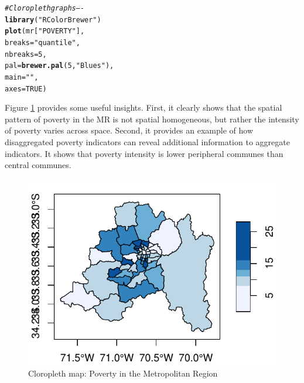 \documentclass[english,12pt]{book}\usepackage[]{graphicx}\usepackage[]{xcolor}
\makeatletter
\def\maxwidth{ %
  \ifdim\Gin@nat@width>\linewidth
    \linewidth
  \else
    \Gin@nat@width
  \fi
}
\newcommand{\hlnum}[1]{\textcolor[rgb]{0.686,0.059,0.569}{#1}}%
\newcommand{\hlstr}[1]{\textcolor[rgb]{0.192,0.494,0.8}{#1}}%
\newcommand{\hlcom}[1]{\textcolor[rgb]{0.678,0.584,0.686}{\textit{#1}}}%
\newcommand{\hlstd}[1]{\textcolor[rgb]{0.345,0.345,0.345}{#1}}%
\newcommand{\hlkwc}[1]{\textcolor[rgb]{0.333,0.667,0.333}{#1}}%
\newcommand{\hlkwd}[1]{\textcolor[rgb]{0.737,0.353,0.396}{\textbf{#1}}}%
\newenvironment{kframe}{%
 \def\at@end@of@kframe{}%
 \ifinner\ifhmode%
  \def\at@end@of@kframe{\end{minipage}}%
  \begin{minipage}{\columnwidth}%
 \fi\fi%
 \def\FrameCommand##1{\hskip\@totalleftmargin \hskip-\fboxsep
 \colorbox{shadecolor}{##1}\hskip-\fboxsep
     \hskip-\linewidth \hskip-\@totalleftmargin \hskip\columnwidth}%
 \MakeFramed {\advance\hsize-\width
   \@totalleftmargin\z@ \linewidth\hsize
   \@setminipage}}%
 {\par\unskip\endMakeFramed%
 \at@end@of@kframe}
\newenvironment{knitrout}{}{} %
\makeatother
\begin{document}
\begin{knitrout}
\color{fgcolor}\begin{kframe}
\begin{alltt}
\hlcom{# Cloropleth graphs ----}
\hlkwd{library}\hlstd{(}\hlstr{"RColorBrewer"}\hlstd{)}
\hlkwd{plot}\hlstd{(mr[}\hlstr{"POVERTY"}\hlstd{],}
       \hlkwc{breaks} \hlstd{=} \hlstr{"quantile"}\hlstd{,}
       \hlkwc{nbreaks} \hlstd{=} \hlnum{5}\hlstd{,}
       \hlkwc{pal} \hlstd{=} \hlkwd{brewer.pal}\hlstd{(}\hlnum{5}\hlstd{,} \hlstr{"Blues"}\hlstd{),}
       \hlkwc{main} \hlstd{=} \hlstr{""}\hlstd{,}
       \hlkwc{axes} \hlstd{=} \hlnum{TRUE}\hlstd{)}
\end{alltt}
\end{kframe}
\end{knitrout}

Figure \ref{fig:cloro-graph} provides some useful insights. First, it clearly shows that the spatial pattern of poverty in the MR is not spatial homogeneous, but rather the intensity of poverty varies across space. Second, it provides an example of how disaggregated poverty indicators can reveal additional information to aggregate indicators. It shows that poverty intensity is lower peripheral communes than central communes. 

\begin{figure}
\caption{Cloropleth map: Poverty in the Metropolitan Region}\label{fig:cloro-graph}
\begin{knitrout}
\color{fgcolor}

{\centering \includegraphics[width=\maxwidth]{figure/cloro-graphs-1} 

}


\end{knitrout}
\end{figure}
\end{document}
